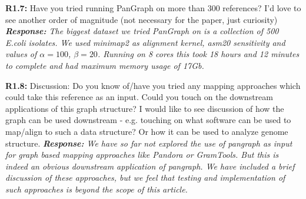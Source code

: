 \documentclass[aps,rmp,onecolumn]{revtex4-1}
\newcommand{\Marco}[1]{{\color{orange}Marco: #1}}
\newcommand{\Liam}[1]{{\color{teal}Liam: #1}}
\newcommand{\reviewer}[2]{\textbf{#1:} #2\vskip 5mm}
\newcommand{\response}[1]{{\it {\color{response}\textbf{Response:} #1}}\vskip 5mm}
\begin{document}
\reviewer{R1.7}{Have you tried running PanGraph on more than 300 references? I'd love to see another order of magnitude (not necessary for the paper, just curiosity)}
\response{The biggest dataset we tried PanGraph on is a collection of 500 E.coli isolates. We used minimap2 as alignment kernel, asm20 sensitivity and values of $\alpha = 100$, $\beta=20$. Running on 8 cores this took 18 hours and 12 minutes to complete and had maximum memory usage of 17Gb.}

\reviewer{R1.8}{Discussion: Do you know of/have you tried any mapping approaches which could take this reference as an input. Could you touch on the downstream applications of this graph structure? I would like to see discussion of how the graph can be used downstream - e.g. touching on what software can be used to map/align to such a data structure? Or how it can be used to analyze genome structure.}
\response{We have so far not explored the use of pangraph as input for graph based mapping approaches like Pandora or GramTools. But this is indeed an obvious downstream application of pangraph. We have included a brief discussion of these approaches, but we feel that testing and implementation of such approaches is beyond the scope of this article.}
\end{document}
